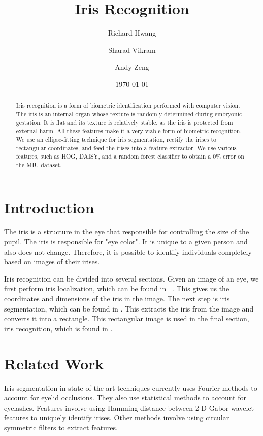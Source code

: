 \documentclass[12pt]{article}
\title{Iris Recognition}
\author{
    Richard Hwang
    \and
    Sharad Vikram
    \and
    Andy Zeng
}
\date{\today}
\begin{document}
\maketitle

\begin{abstract}
Iris recognition is a form of biometric identification performed with computer vision. The iris is an internal organ whose texture is randomly determined during embryonic gestation. It is flat and its texture is relatively stable, as the iris is protected from external harm.  All these features make it a very viable form of biometric recognition. We use an ellipse-fitting technique for iris segmentation, rectify the irises to rectangular coordinates, and feed the irises into a feature extractor. We use various features, such as HOG, DAISY, and a random forest classifier to obtain a 0\% error on the MIU dataset.

\end{abstract}

\newpage

\section{Introduction}
\label{sec:intro}
The iris is a structure in the eye that responsible for controlling the size of the pupil. The iris is responsible for "eye color". It is unique to a given person and also does not change. \cite{wildes} Therefore, it is possible to identify individuals completely based on images of their irises.

Iris recognition can be divided into several sections. Given an image of an eye, we first perform iris localization, which can be found in ~. This gives us the coordinates and dimensions of the iris in the image. The next step is iris segmentation, which can be found in . This extracts the iris from the image and converts it into a rectangle. This rectangular image is used in the final section, iris recognition, which is found in .

\section{Related Work}
\label{sec:related}
Iris segmentation in state of the art techniques currently uses Fourier methods to account for eyelid occlusions. They also use statistical methods to account for eyelashes. \cite{daugman2}
Features involve using Hamming distance between 2-D Gabor wavelet features to uniquely identify irises. \cite{daugman} \cite{daugman2} Other methods involve using circular symmetric filters to extract features. \cite{ma}
\end{document}

